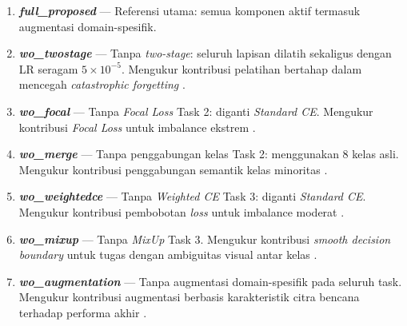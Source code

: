 \begin{enumerate}[noitemsep]
    \item \textbf{\textit{full\_proposed}} — Referensi utama: semua
    komponen aktif termasuk augmentasi domain-spesifik.
    \item \textbf{\textit{wo\_twostage}} — Tanpa \textit{two-stage}:
    seluruh lapisan dilatih sekaligus dengan LR seragam
    $5 \times 10^{-5}$. Mengukur kontribusi pelatihan bertahap dalam
    mencegah \textit{catastrophic forgetting}
    \cite{kirkpatrick2017catastrophic}.
    \item \textbf{\textit{wo\_focal}} — Tanpa \textit{Focal Loss} Task 2:
    diganti \textit{Standard CE}. Mengukur kontribusi \textit{Focal Loss}
    untuk imbalance ekstrem \cite{lin2017focal, singh2023bbfl}.
    \item \textbf{\textit{wo\_merge}} — Tanpa penggabungan kelas Task 2:
    menggunakan 8 kelas asli. Mengukur kontribusi penggabungan semantik
    kelas minoritas \cite{ofli2020analysis, zhou2018superclass}.
    \item \textbf{\textit{wo\_weightedce}} — Tanpa \textit{Weighted CE}
    Task 3: diganti \textit{Standard CE}. Mengukur kontribusi pembobotan
    \textit{loss} untuk imbalance moderat \cite{polat2025cdwce}.
    \item \textbf{\textit{wo\_mixup}} — Tanpa \textit{MixUp} Task 3.
    Mengukur kontribusi \textit{smooth decision boundary} untuk tugas
    dengan ambiguitas visual antar kelas \cite{zhang2018mixup}.
    \item \textbf{\textit{wo\_augmentation}} — Tanpa augmentasi
    domain-spesifik pada seluruh task. Mengukur kontribusi augmentasi
    berbasis karakteristik citra bencana terhadap performa akhir
    \cite{shorten2019survey}.
\end{enumerate}


